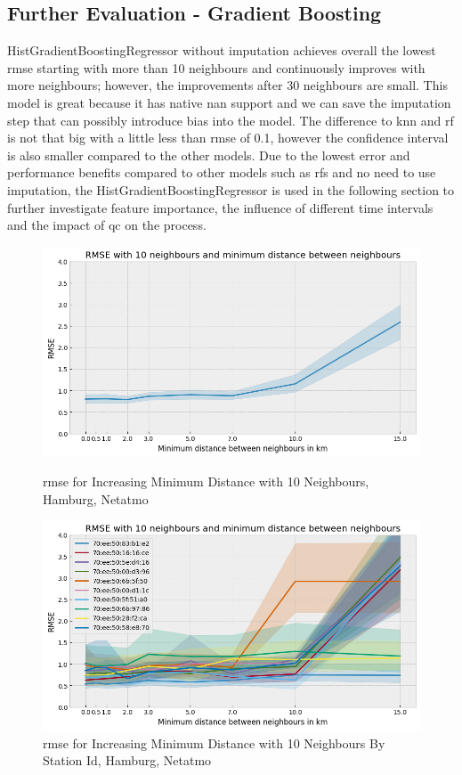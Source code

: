 \subsection{Further Evaluation - Gradient Boosting}

HistGradientBoostingRegressor without imputation achieves overall the lowest \gls{rmse} starting with more than 10 neighbours and continuously improves with more neighbours; however, the improvements after 30 neighbours are small. This model is great because it has native \gls{nan} support and we can save the imputation step that can possibly introduce bias into the model. The difference to \gls{knn} and \gls{rf} is not that big with a little less than \gls{rmse} of 0.1, however the confidence interval is also smaller compared to the other models. Due to the lowest error and performance benefits compared to other models such as \gls{rf}s and no need to use imputation, the HistGradientBoostingRegressor is used in the following section to further investigate feature importance, the influence of different time intervals and the impact of \gls{qc} on the process.\\

\begin{figure}[htp]
    \centering
    \includegraphics[width=1\textwidth]{images/rmse_10_neighbours_min_distance.png}
    \caption{\gls{rmse} for Increasing Minimum Distance with 10 Neighbours, Hamburg, Netatmo}
    \label{fig:eval hamburg minimum distance between stations}

    \centering
    \includegraphics[width=1\textwidth]{images/rmse_10_neighbours_min_distance_by_pid.png}
    \caption{\gls{rmse} for Increasing Minimum Distance with 10 Neighbours By Station Id, Hamburg, Netatmo}
    \label{fig:eval hamburg minimum distance between stations by station id}
\end{figure}

